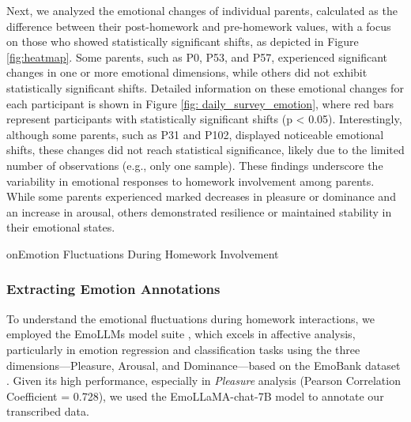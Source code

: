 Next, we analyzed the emotional changes of individual parents, calculated as the difference between their post-homework and pre-homework values, with a focus on those who showed statistically significant shifts, as depicted in Figure \ref{fig:heatmap}. Some parents, such as P0, P53, and P57, experienced significant changes in one or more emotional dimensions, while others did not exhibit statistically significant shifts. Detailed information on these emotional changes for each participant is shown in Figure \ref{fig: daily_survey_emotion}, where red bars represent participants with statistically significant shifts (p < 0.05). Interestingly, although some parents, such as P31 and P102, displayed noticeable emotional shifts, these changes did not reach statistical significance, likely due to the limited number of observations (e.g., only one sample). These findings underscore the variability in emotional responses to homework involvement among parents. While some parents experienced marked decreases in pleasure or dominance and an increase in arousal, others demonstrated resilience or maintained stability in their emotional states.

on{Emotion Fluctuations During Homework Involvement} 
\subsubsection{Extracting Emotion Annotations}


To understand the emotional fluctuations during homework interactions, we employed the EmoLLMs model suite \cite{liu2024emollms}, which excels in affective analysis, particularly in emotion regression and classification tasks using the three dimensions—Pleasure, Arousal, and Dominance—based on the EmoBank dataset \cite{buechel2022emobank}. Given its high performance, especially in \textit{Pleasure} analysis (Pearson Correlation Coefficient = 0.728), we used the EmoLLaMA-chat-7B model \cite{liu2024emollms} to annotate our transcribed data.

